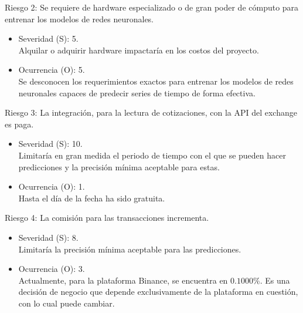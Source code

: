 \documentclass[
    11pt, %
]{charter}
\begin{document}
        Riesgo 2: Se requiere de hardware especializado o de gran poder de cómputo para entrenar los modelos de redes neuronales.
        \begin{itemize}
            \item Severidad (S): 5.\\
            Alquilar o adquirir hardware impactaría en los costos del proyecto.
            \item Ocurrencia (O): 5.\\
            Se desconocen los requerimientos exactos para entrenar los modelos de redes neuronales capaces de predecir series de tiempo de forma efectiva.
        \end{itemize}

        Riesgo 3: La integración, para la lectura de cotizaciones, con la API del exchange es paga.
        \begin{itemize}
        \item Severidad (S): 10.\\
          Limitaría en gran medida el periodo de tiempo con el que se pueden hacer predicciones y la precisión mínima aceptable para estas.
        \item Ocurrencia (O): 1.\\
          Hasta el día de la fecha ha sido gratuita.
        \end{itemize}

        Riesgo 4: La comisión para las transacciones incrementa.
        \begin{itemize}
        \item Severidad (S): 8.\\
          Limitaría la precisión mínima aceptable para las predicciones.
        \item Ocurrencia (O): 3.\\
          Actualmente, para la plataforma Binance, se encuentra en $0.1000\%$. Es una decisión de negocio que depende exclusivamente de la plataforma en cuestión, con lo cual puede cambiar.
        \end{itemize}
\end{document}
